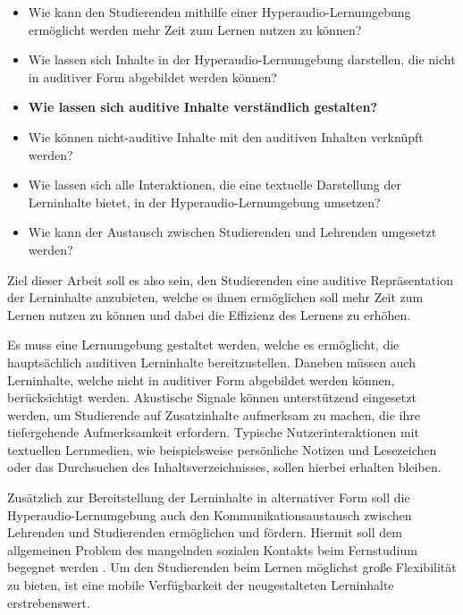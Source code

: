 \begin{itemize}
\item Wie kann den Studierenden mithilfe einer Hyperaudio-Lernumgebung ermöglicht werden mehr Zeit zum Lernen nutzen zu können?
\item Wie lassen sich Inhalte in der Hyperaudio-Lernumgebung darstellen, die nicht in auditiver Form abgebildet werden können?
\item \textbf{Wie lassen sich auditive Inhalte verständlich gestalten?}
\item Wie können nicht-auditive Inhalte mit den auditiven Inhalten verknüpft werden?
\item Wie lassen sich alle Interaktionen, die eine textuelle Darstellung der Lerninhalte bietet, in der Hyperaudio-Lernumgebung umsetzen?
\item Wie kann der Austausch zwischen Studierenden und Lehrenden umgesetzt werden?
\end{itemize}

Ziel dieser Arbeit soll es also sein, den Studierenden eine auditive Repräsentation der Lerninhalte anzubieten, welche es ihnen ermöglichen soll mehr Zeit zum Lernen nutzen zu können und dabei die Effizienz des Lernens zu erhöhen. 

Es muss eine Lernumgebung gestaltet werden, welche es ermöglicht, die hauptsächlich auditiven Lerninhalte bereitzustellen. Daneben müssen auch Lerninhalte, welche nicht in auditiver Form abgebildet werden können, berücksichtigt werden. Akustische Signale können unterstützend eingesetzt werden, um Studierende auf Zusatzinhalte aufmerksam zu machen, die ihre tiefergehende Aufmerksamkeit erfordern. Typische Nutzerinteraktionen mit textuellen Lernmedien, wie beispielsweise persönliche Notizen und Lesezeichen oder das Durchsuchen des Inhaltsverzeichnisses, sollen hierbei erhalten bleiben.

Zusätzlich zur Bereitstellung der Lerninhalte in alternativer Form soll die Hyperaudio-Lernumgebung auch den Kommunikationsaustausch zwischen Lehrenden und Studierenden ermöglichen und fördern. Hiermit soll dem allgemeinen Problem des mangelnden sozialen Kontakts beim Fernstudium begegnet werden \citep{kerres2002didaktische}. Um den Studierenden beim Lernen möglichst große Flexibilität zu bieten, ist eine mobile Verfügbarkeit der neugestalteten Lerninhalte erstrebenswert.




